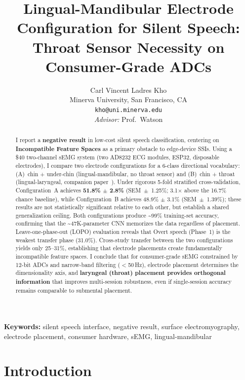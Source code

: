 \documentclass[11pt, a4paper]{article}
\title{Lingual-Mandibular Electrode Configuration for Silent Speech:\\Throat Sensor Necessity on Consumer-Grade ADCs}
\author{Carl Vincent Ladres Kho\\
Minerva University, San Francisco, CA\\
\texttt{kho@uni.minerva.edu}\\[0.5em]
\textit{Advisor:} Prof.\ Watson}
\date{}
\begin{document}
\maketitle

\begin{abstract}
I report a \textbf{negative result} in low-cost silent speech classification, centering on \textbf{Incompatible Feature Spaces} as a primary obstacle to edge-device SSIs. Using a \$40 two-channel sEMG system (two AD8232 ECG modules, ESP32, disposable electrodes), I compare two electrode configurations for a 6-class directional vocabulary: (A)~chin + under-chin (lingual-mandibular, no throat sensor) and (B)~chin + throat (lingual-laryngeal, companion paper~\cite{kho2026companion}). Under rigorous 5-fold stratified cross-validation, Configuration~A achieves \textbf{51.8\% $\pm$ 2.8\%} (SEM~$\pm$~1.25\%; 3.1$\times$ above the 16.7\% chance baseline), while Configuration~B achieves 48.9\% $\pm$ 3.1\% (SEM~$\pm$~1.39\%); these results are not statistically significant relative to each other, but establish a shared generalization ceiling. Both configurations produce \textasciitilde99\% training-set accuracy, confirming that the \textasciitilde47K-parameter CNN memorizes the data regardless of placement. Leave-one-phase-out (LOPO) evaluation reveals that Overt speech (Phase~1) is the weakest transfer phase (31.0\%). Cross-study transfer between the two configurations yields only 25--31\%, establishing that electrode placements create fundamentally incompatible feature spaces. I conclude that for consumer-grade sEMG constrained by 12-bit ADCs and narrow-band filtering ($<$50\,Hz), electrode placement determines the dimensionality axis, and \textbf{laryngeal (throat) placement provides orthogonal information} that improves multi-session robustness, even if single-session accuracy remains comparable to submental placement.
\end{abstract}

\noindent\textbf{Keywords:} silent speech interface, negative result, surface electromyography, electrode placement, consumer hardware, sEMG, lingual-mandibular

\section{Introduction}
\end{document}
